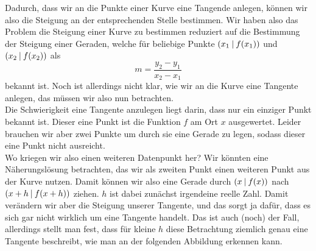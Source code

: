 \documentclass[../../main.tex]{subfiles}
\begin{document}
    \begin{center}\normalsize
    \end{center}
    Dadurch, dass wir an die Punkte einer Kurve eine Tangende anlegen, können wir also die Steigung an der entsprechenden Stelle bestimmen. Wir haben also das Problem die Steigung einer Kurve zu bestimmen reduziert auf die Bestimmung der Steigung einer Geraden, welche für beliebige Punkte $\left(x_1 \:\middle|\: f(x_1)\right)$ und $\left(x_2 \:\middle|\: f(x_2)\right)$ als
    $$m = \frac{y_2 - y_1}{x_2 - x_1}$$
    bekannt ist. Noch ist allerdings nicht klar, wie wir an die Kurve eine Tangente anlegen, das müssen wir also nun betrachten.\\
    Die Schwierigkeit eine Tangente anzulegen liegt darin, dass nur ein einziger Punkt bekannt ist. Dieser eine Punkt ist die Funktion $f$ am Ort $x$ ausgewertet. Leider brauchen wir aber zwei Punkte um durch sie eine Gerade zu legen, sodass dieser eine Punkt nicht ausreicht.\\
    Wo kriegen wir also einen weiteren Datenpunkt her? Wir könnten eine Näherungslösung betrachten, das wir als zweiten Punkt einen weiteren Punkt aus der Kurve nutzen. Damit können wir also eine Gerade durch $\left(x \:\middle|\: f(x)\right)$ nach $\left(x+h \:\middle|\: f(x+h)\right)$ ziehen. $h$ ist dabei zunächst irgendeine reelle Zahl. Damit verändern wir aber die Steigung unserer Tangente, und das sorgt ja dafür, dass es sich gar nicht wirklich um eine Tangente handelt. Das ist auch (noch) der Fall, allerdings stellt man fest, dass für kleine $h$ diese Betrachtung ziemlich genau eine Tangente beschreibt, wie man an der folgenden Abbildung erkennen kann.
    \begin{center}\normalsize
    \end{center}
             
\end{document}
